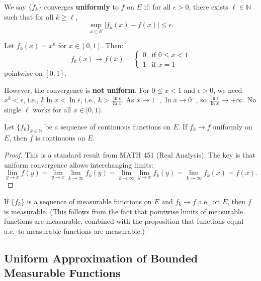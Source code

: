 \documentclass[11pt]{report}
\begin{document}
\begin{defbox}
We say $\{f_k\}$ converges \textbf{uniformly} to $f$ on $E$ if: for all $\epsilon > 0$, there exists $\ell \in \mathbb{N}$ such that for all $k \geq \ell$,
\[
\sup_{x \in E} |f_k(x) - f(x)| \leq \epsilon.
\]
\end{defbox}

\begin{exbox}
Let $f_k(x) = x^k$ for $x \in [0, 1]$. Then:
\[
f_k(x) \to f(x) = \begin{cases} 0 & \text{if } 0 \leq x < 1 \\ 1 & \text{if } x = 1 \end{cases}
\]
pointwise on $[0, 1]$.

However, the convergence is \textbf{not uniform}. For $0 \leq x < 1$ and $\epsilon > 0$, we need $x^k < \epsilon$, i.e., $k \ln x < \ln \epsilon$, i.e., $k > \frac{\ln \epsilon}{\ln x}$. As $x \to 1^-$, $\ln x \to 0^-$, so $\frac{\ln \epsilon}{\ln x} \to +\infty$. No single $\ell$ works for all $x \in [0, 1)$.
\end{exbox}

\begin{thmbox}
Let $\{f_k\}_{k \in \mathbb{N}}$ be a sequence of continuous functions on $E$. If $f_k \to f$ uniformly on $E$, then $f$ is continuous on $E$.
\end{thmbox}

\begin{proof}
This is a standard result from MATH 451 (Real Analysis). The key is that uniform convergence allows interchanging limits:
\[
\lim_{y \to x} f(y) = \lim_{y \to x} \lim_{k \to \infty} f_k(y) = \lim_{k \to \infty} \lim_{y \to x} f_k(y) = \lim_{k \to \infty} f_k(x) = f(x).
\]
\end{proof}

\begin{rembox}
If $\{f_k\}$ is a sequence of measurable functions on $E$ and $f_k \to f$ a.e.\ on $E$, then $f$ is measurable. (This follows from the fact that pointwise limits of measurable functions are measurable, combined with the proposition that functions equal a.e.\ to measurable functions are measurable.)
\end{rembox}

\subsection{Uniform Approximation of Bounded Measurable Functions}
\end{document}
